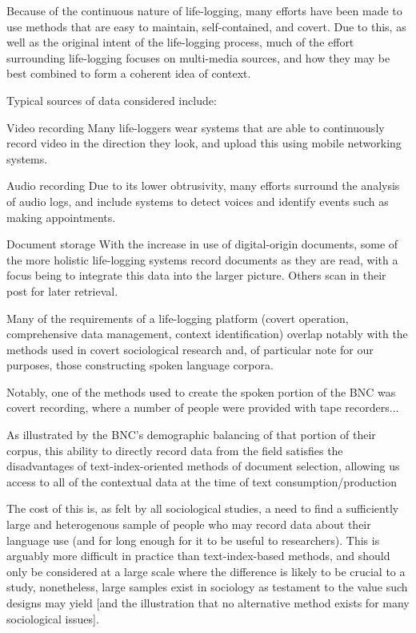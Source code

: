 Because of the continuous nature of life-logging, many efforts have been made to use methods that are easy to maintain, self-contained, and covert.  %
Due to this, as well as the original intent of the life-logging process, much of the effort surrounding life-logging focuses on multi-media sources, and how they may be best combined to form a coherent idea of context.  

Typical sources of data considered include:

\begin{itemizeTitle}
    \item[Video recording] Many life-loggers wear systems that are able to continuously record video in the direction they look, and upload this using mobile networking systems.
    \item[Audio recording] Due to its lower obtrusivity, many efforts surround the analysis of audio logs, and include systems to detect voices and identify events such as making appointments.
    \item[Document storage] With the increase in use of digital-origin documents, some of the more holistic life-logging systems record documents as they are read, with a focus being to integrate this data into the larger picture.  Others scan in their post for later retrieval.
\end{itemizeTitle}

Many of the requirements of a life-logging platform (covert operation, comprehensive data management, context identification) overlap notably with the methods used in covert sociological research and, of particular note for our purposes, those constructing spoken language corpora.

Notably, one of the methods used to create the spoken portion of the BNC was covert recording, where a number of people were provided with tape recorders...

As illustrated by the BNC's demographic balancing of that portion of their corpus, this ability to directly record data from the field satisfies the disadvantages of text-index-oriented methods of document selection, allowing us access to all of the contextual data at the time of text consumption/production 

The cost of this is, as felt by all sociological studies, a need to find a sufficiently large and heterogenous sample of people who may record data about their language use (and for long enough for it to be useful to researchers).  This is arguably more difficult in practice than text-index-based methods, and should only be considered at a large scale where the difference is likely to be crucial to a study, nonetheless, large samples exist in sociology as testament to the value such designs may yield [and the illustration that no alternative method exists for many sociological issues].

